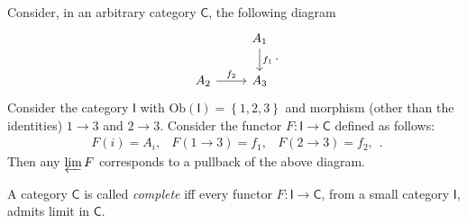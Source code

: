 \begin{ex}
	Consider, in an arbitrary category $\mathsf{C}$, the following diagram
	\begin{equation}
	\begin{tikzcd}
		& A_1 \arrow[d, "f_1", rightarrow] \\
		A_2 \arrow[r, "f_2", rightarrow] &
		A_3
	\end{tikzcd}
	.\end{equation} 
	Consider the category $\mathsf{I}$ with $\mathrm{Ob} \left(\mathsf{I}\right) = \left\{ 1, 2, 3 \right\}$ and morphism (other than the identities) $1 \to 3$ and $2 \to 3$.
	Consider the functor $F\colon \mathsf{I} \to \mathsf{C}$ defined as follows:
	 \begin{equation}
		 \begin{matrix}
			 F(i) = A_i, &
			 F( 1 \to 3) = f_1, &
			 F( 2 \to 3) = f_2,
		 \end{matrix} 
	.\end{equation} 
	Then any $\varprojlim F$ corresponds to a pullback of the above diagram.
\end{ex} 

\begin{defn}
	A category $\mathsf{C}$ is called {\em complete} iff 
	every functor $F\colon \mathsf{I} \to \mathsf{C}$, from a small category $\mathsf{I}$, admits limit in $\mathsf{C}$.
\end{defn}

